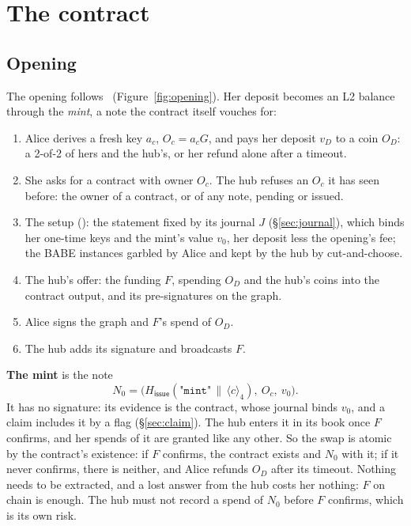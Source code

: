 \documentclass[11pt]{article}
\theoremstyle{plain}
\theoremstyle{definition}
\newcommand{\be}[2]{\langle #1\rangle_{#2}}
\newcommand{\Ht}[1]{H_{\textsf{#1}}}
\newcommand{\Oc}{O_c}
\begin{document}
\section{The contract}

\subsection{Opening}\label{sec:opening}

The opening follows~\cite{lichen} (Figure~\ref{fig:opening}). Her
deposit becomes an L2 balance through the \emph{mint}, a note the
contract itself vouches for:
\begin{enumerate}[nosep]
\item Alice derives a fresh key $a_c$, $\Oc = a_cG$, and pays her
  deposit $v_D$ to a coin $O_D$: a 2-of-2 of hers and the hub's, or her
  refund alone after a timeout.
\item She asks for a contract with owner $\Oc$. The hub refuses an $\Oc$
  it has seen before: the owner of a contract, or of any note, pending
  or issued.
\item The setup (\cite{lichen}): the statement fixed by its journal $J$
  (\S\ref{sec:journal}), which binds her one-time keys and the mint's
  value $v_0$, her deposit less the opening's fee; the BABE instances
  garbled by Alice and kept by the hub by cut-and-choose.
\item The hub's offer: the funding $F$, spending $O_D$ and the hub's
  coins into the contract output, and its pre-signatures on the graph.
\item Alice signs the graph and $F$'s spend of $O_D$.
\item The hub adds its signature and broadcasts $F$.
\end{enumerate}
\textbf{The mint} is the note
\[
  N_0 = \big(\Ht{issue}(\texttt{"mint"} \,\|\, \be{c}{4}),\ \Oc,\ v_0\big).
\]
It has no signature: its evidence is the contract, whose journal binds
$v_0$, and a claim includes it by a flag (\S\ref{sec:claim}). The hub
enters it in its book once $F$ confirms, and her spends of it are
granted like any other. So the swap is atomic by the contract's
existence: if $F$ confirms, the contract exists and $N_0$ with it; if
it never confirms, there is neither, and Alice refunds $O_D$ after its
timeout. Nothing needs to be extracted, and a lost answer from the hub
costs her nothing: $F$ on chain is enough. The hub must not record a
spend of $N_0$ before $F$ confirms, which is its own risk.
\end{document}
